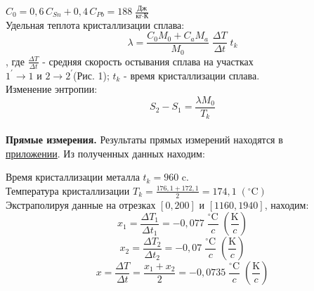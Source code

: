 \documentclass[a4paper]{scrartcl}
\begin{document}
 $ C_0 = 0,6\,C_{Sn}+0,4\,C_{Pb} = 188\; \frac{\mbox{Дж}}{\mbox{кг} \cdot \mbox{К}}$\\
 


 Удельная теплота кристаллизации сплава:\hypertarget{formul1}{}
 \begin{equation}
 	\lambda=\frac{C_0M_0+C_aM_a}{M_0}\;\frac{\Delta T}{\Delta t}\; t_k
 \end{equation}
, где $ \frac{\Delta T}{\Delta t} $ - средняя скорость остывания сплава на участках \\
$ 1^{'}\rightarrow1 $ и $ 2\rightarrow2^{'} $(Рис. 1); $ t_k $ - время кристаллизации сплава.\\

  Изменение энтропии:\hypertarget{formul2}{}
\begin{equation}
	S_2-S_1=\frac{\lambda M_0}{T_k}
\end{equation}\\

\textbf{Прямые измерения.}
Результаты прямых измерений находятся в \\ \hyperlink{table}{приложении}. Из полученных данных находим:

Время кристаллизации металла $ t_k= 960$ c.\\

Температура  кристаллизации $ T_k=\frac{176,1+172,1}{2}=174,1\;(^{\circ}\mbox{C}) $\\

Экстраполируя данные на отрезках $ [0,200] $ и $ [1160,1940] $, находим:
$$ x_1 = \frac{\Delta T_1}{\Delta t_1}=-0,077\; \frac{^\circ\mbox{C}}{c}\;\left( \frac{\mbox{K}}{c}\right) $$
$$ x_2 = \frac{\Delta T_2}{\Delta t_2}=-0,07\; \frac{^\circ\mbox{C}}{c}\;\left( \frac{\mbox{K}}{c}\right)$$
$$x=\frac{\Delta T}{\Delta t}=\frac{x_1+x_2}{2}=-0,0735\; \frac{^\circ\mbox{C}}{c}\;\left( \frac{\mbox{K}}{c}\right)$$\\
\end{document}
